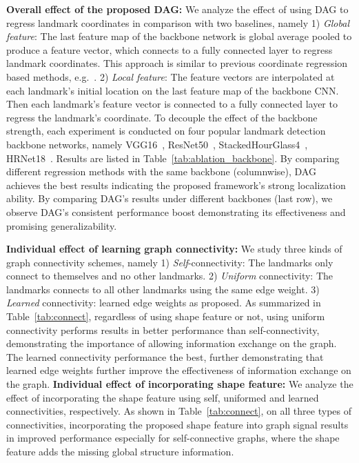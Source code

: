 \documentclass[runningheads]{llncs}
\begin{document}
\textbf{Overall effect of the proposed DAG:} We analyze the effect of using DAG to regress landmark coordinates in comparison with two baselines, namely 1) \textit{Global feature}: The last feature map of the backbone network is global average pooled to produce a feature vector, which connects to a fully connected layer to regress landmark coordinates. This approach is similar to previous coordinate regression based methods, e.g.~\cite{wu2017leveraging,zhang2015learning}. 2) \textit{Local feature}: The feature vectors are interpolated at each landmark's initial location on the last feature map of the backbone CNN. Then each landmark's feature vector is connected to a fully connected layer to regress the landmark's coordinate. To decouple the effect of the backbone strength, each experiment is conducted on four popular landmark detection backbone networks, namely VGG16~\cite{simonyan2014very}, ResNet50~\cite{he2016deep}, StackedHourGlass4~\cite{newell2016stacked}, HRNet18~\cite{sun2019deep}. Results are listed in Table~\ref{tab:ablation_backbone}. By comparing different regression methods with the same backbone (columnwise), DAG achieves the best results indicating the proposed framework's strong localization ability. By comparing DAG's results under different backbones (last row), we observe DAG's consistent performance boost demonstrating its effectiveness and promising generalizability.

\textbf{Individual effect of learning graph connectivity:}
We study three kinds of graph connectivity schemes, namely 1) \textit{Self}-connectivity: The landmarks only connect to themselves and no other landmarks. 2) \textit{Uniform} connectivity: The landmarks connects to all other landmarks using the same edge weight. 3) \textit{Learned} connectivity: learned edge weights as proposed. As summarized in Table~\ref{tab:connect}, regardless of using shape feature or not, using uniform connectivity performs results in better performance than self-connectivity, demonstrating the importance of allowing information exchange on the graph. The learned connectivity performance the best, further demonstrating that learned edge weights further improve the effectiveness of information exchange on the graph. 
\textbf{Individual effect of incorporating shape feature:}
We analyze the effect of incorporating the shape feature using self, uniformed and learned connectivities, respectively. As shown in Table~\ref{tab:connect}, on all three types of connectivities, incorporating the proposed shape feature into graph signal results in improved performance especially for self-connective graphs, where the shape feature adds the missing global structure information.
\end{document}
